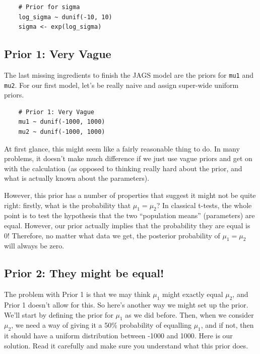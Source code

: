 \begin{framed}
\begin{verbatim}
    # Prior for sigma
    log_sigma ~ dunif(-10, 10)
    sigma <- exp(log_sigma)
\end{verbatim}
\end{framed}

\subsection{Prior 1: Very Vague}
The last missing ingredients to finish the JAGS model are the priors for
{\tt mu1} and {\tt mu2}. For our first model, let's be really naive and assign
super-wide uniform priors.

\begin{framed}
\begin{verbatim}
    # Prior 1: Very Vague
    mu1 ~ dunif(-1000, 1000)
    mu2 ~ dunif(-1000, 1000)
\end{verbatim}
\end{framed}

At first glance, this might seem like a fairly reasonable thing to do. In many
problems, it doesn't make much difference if we just use vague priors and get
on with the calculation (as opposed to thinking really hard about the prior,
and what is actually known about the parameters).

However, this prior has a number of properties that suggest it might not be
quite right: firstly, what is the probability that $\mu_1 = \mu_2$?
In classical t-tests, the whole point is to test the hypothesis that
the two ``population means'' (parameters) are equal. However, our prior
actually implies that the probability they are equal is 0! Therefore, no matter
what data we get, the posterior probability of $\mu_1 = \mu_2$ will always be
zero.

\subsection{Prior 2: They might be equal!}
The problem with Prior 1 is that we may think $\mu_1$ might exactly equal
$\mu_2$, and Prior 1 doesn't allow for this. So here's another way we might
set up the prior. We'll start by defining the prior for $\mu_1$ as we did
before. Then, when we consider $\mu_2$, we need a way of giving it a
50\% probability of equalling $\mu_1$, and if not, then it should have
a uniform distribution between -1000 and 1000. Here is our solution. Read it
carefully and make sure you understand what this prior does.

